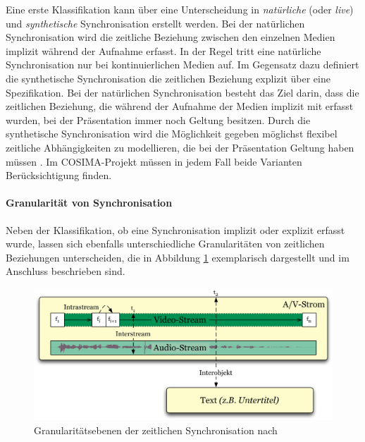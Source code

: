   Eine erste Klassifikation kann über eine Unterscheidung in \emph{natürliche} (oder \emph{live}) und \emph{synthetische} Synchronisation \citep{little1991ms,little1991msp,steinmetz1992mst} erstellt werden. Bei der natürlichen Synchronisation wird die zeitliche Beziehung zwischen den einzelnen Medien implizit wäh\-rend der Aufnahme erfasst. In der Regel tritt eine natürliche Synchronisation nur bei kontinuierlichen Medien auf. Im Gegensatz dazu definiert die synthetische Synchronisation die zeitlichen Beziehung explizit über eine Spezifikation. Bei der natürlichen Synchronisation besteht das Ziel darin, dass die zeitlichen Beziehung, die während der Aufnahme der Medien implizit mit erfasst wurden, bei der Präsentation immer noch Geltung besitzen. Durch die synthetische Synchronisation wird die Möglichkeit gegeben möglichst flexibel zeitliche Abhängigkeiten zu modellieren, die bei der Präsentation Geltung haben müssen \citep[S. 613]{bertino1998tsm}. Im COSIMA-Projekt müssen in jedem Fall beide Varianten Berücksichtigung finden.
  

\paragraph{Granularität von Synchronisation} %
\label{par:granularitaet_von_synchronisation}

  Neben der Klassifikation, ob eine Synchronisation implizit oder explizit erfasst wurde, lassen sich ebenfalls unterschiedliche Granularitäten von zeitlichen Beziehungen unterscheiden, die in Abbildung \ref{fig:granularitaetsebenen} exemplarisch dargestellt und im Anschluss beschrieben sind.
  
  \begin{figure}[!ht]
    \centering
      \includegraphics[width=.9\textwidth]{images/Granularitaetsebenen.pdf}
    \caption{Granularitätsebenen der zeitlichen Synchronisation nach \citep{antons09}}
    \label{fig:granularitaetsebenen}
  \end{figure}
  
